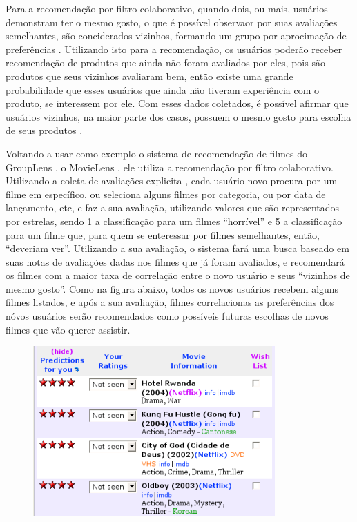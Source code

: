 \documentclass[12pt,
				openright,
				twoside,
				a4paper,
				apter=TITLE,
				section=TITLE,
				subsection=TITLE,
				chapter=TITLE,
				english,
				french,
				spanish,
				brazil]{abntex2}
\begin{document}
Para a recomendação por filtro colaborativo, quando dois, ou mais, usuários demonstram ter o mesmo gosto, o que é possível observaor por suas avaliações semelhantes, são conciderados vizinhos, formando um grupo por aprocimação de preferências \cite{asanov2011algorithms}. Utilizando isto para a recomendação, os usuários poderão receber recomendação de produtos que ainda não foram avaliados por eles, pois são produtos que seus vizinhos avaliaram bem, então existe uma grande probabilidade que esses usuários que ainda não tiveram experiência com o produto, se interessem por ele. Com esses dados coletados, é possível afirmar que usuários vizinhos, na maior parte dos casos, possuem o mesmo gosto para escolha de seus produtos \cite{miller2003movielens}.

Voltando a usar como exemplo o sistema de recomendação de filmes do GroupLens \cite{resnick1994grouplen} \cite{konstan1997grouplens}, o MovieLens \cite{miller2003movielens}, ele utiliza a recomendação por filtro colaborativo. Utilizando a coleta de avaliações explicita \cite{melville2010recommender}, cada usuário novo procura por um filme em específico, ou seleciona alguns filmes por categoria, ou por data de lançamento, etc, e faz a sua avaliação, utilizando valores que são representados por estrelas, sendo 1 a classificação para um filmes ``horrível'' e 5 a classificação para um filme que, para quem se enteressar por filmes semelhantes, então, ``deveriam ver''. Utilizando a sua avaliação, o sistema fará uma busca baseado em suas notas de avaliações dadas nos filmes que já foram avaliados, e recomendará os filmes com a maior taxa de correlação entre o novo usuário e seus ``vizinhos de mesmo gosto''. Como na figura abaixo, todos os novos usuários recebem alguns filmes listados, e após a sua avaliação, filmes correlacionas as preferências dos nóvos usuários serão recomendados como possíveis futuras escolhas de novos filmes que vão querer assistir.

\begin{figure}
\centering
\includegraphics[scale=0.4]{img/movielens2}
\end{figure}
\end{document}
